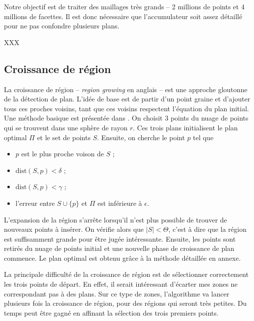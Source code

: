 \documentclass[12pt, twoside]{article}
\begin{document}
Notre objectif est de traiter des maillages très grands -- 2 millions de points et 4 millions de facettes. Il est donc nécessaire que l'accumulateur soit assez détaillé pour ne pas confondre plusieurs plans.

XXX

\subsection{Croissance de région}
La croissance de région -- \textit{region growing} en anglais – est une approche gloutonne de la détection de plan. L’idée de base est de partir d’un point graine et d’ajouter tous ces proches voisins, tant que ces voisins respectent l’équation du plan initial. Une méthode basique est présentée dans \cite{reggrow1}. On choisit 3 points du nuage de points qui se trouvent dans une sphère de rayon $r$. Ces trois plans initialisent le plan optimal $\Pi$ et le set de points $S$. Ensuite, on cherche le point $p$ tel que
\begin{itemize}
  \item $p$ est le plus proche voison de $S$ ;
  \item $\text{dist}(S,p) < \delta$ ;
  \item $\text{dist}(S,p) < \gamma$ ;
  \item l'erreur entre $S\cup\{p\}$ et $\Pi$ est inférieure à $\epsilon$.
\end{itemize}

L'expansion de la région s'arrête lorsqu'il n'est plus possible de trouver de nouveaux points à insérer. On vérifie alors que $\vert S\vert < \Theta$, c'est à dire que la région est suffisamment grande pour être jugée intéressante. Ensuite, les points sont retirés du nuage de points initial et une nouvelle phase de croissance de plan commence. Le plan optimal est obtenu grâce à la méthode détaillée en annexe.

La principale difficulté de la croissance de région est de sélectionner correctement les trois points de départ. En effet, il serait intéressant d'écarter mes zones ne correspondant pas à des plans. Sur ce type de zones, l'algorithme va lancer plusieurs fois la croissance de région, pour des régions qui seront très petites. Du temps peut être gagné en affinant la sélection des trois premiers points.
\end{document}
